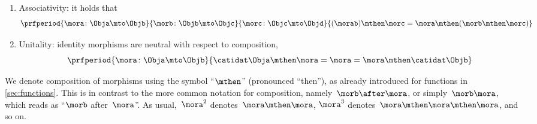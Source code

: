 \begin{ctdefinition}[Category]
\begin{body}
\begin{enumerate}
        \end{enumerate}
        \condit
        \begin{enumerate}
            \item \label{category-associativity}
                  Associativity: it holds that
                  \begin{equation}\label{eq:category-associativity}
                      \prfperiod{
                          \mora\colon \Obja \mto \Objb
                      }{
                          \morb\colon \Objb \mto \Objc
                      }{
                          \morc\colon \Objc \mto \Objd
                      }{
                          (\morab)
                          \mthen \morc= \mora \mthen (\morb \mthen \morc)
                      }
                  \end{equation}
            \item \label{category-unitality}
                  Unitality: identity morphisms are neutral with respect to composition,
                                    \begin{equation}\label{eq:category-unitality}
                      \prfperiod{
                          \mora\colon \Obja \mto \Objb
                      }{
                          \catidat\Obja \mthen \mora = \mora = \mora \mthen \catidat\Objb
                      }
                  \end{equation}
        \end{enumerate}
    \end{body}
\end{ctdefinition}




\begin{remark}
    We denote composition of morphisms using the symbol ``$\mthen$'' (pronounced ``then''), as already introduced for functions in \cref{sec:functions}.
    This is in contrast to the more common notation for composition, namely~$\morb\after \mora$, or simply~$\morb \mora$, which reads as ``$\morb$ after~$\mora$''.
    As usual,~$\mora^2$ denotes~$\mora \mthen \mora$, $\mora^3$ denotes~$\mora \mthen \mora \mthen \mora$, and so on.
\end{remark}

